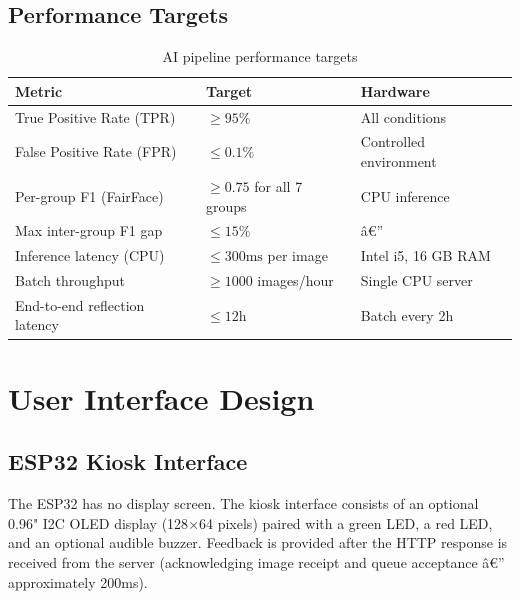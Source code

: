 \documentclass[12pt,a4paper]{report}
\begin{document}
\section{Performance Targets}

\begin{table}[H]
\centering\small
\caption{AI pipeline performance targets}
\begin{tabular}{lll}
\toprule
\textbf{Metric} & \textbf{Target} & \textbf{Hardware} \\
\midrule
True Positive Rate (TPR)     & $\geq 95\%$ & All conditions \\
False Positive Rate (FPR)    & $\leq 0.1\%$ & Controlled environment \\
Per-group F1 (FairFace)      & $\geq 0.75$ for all 7 groups & CPU inference \\
Max inter-group F1 gap       & $\leq 15\%$  & â€” \\
Inference latency (CPU)      & $\leq 300\text{ms}$ per image & Intel i5, 16 GB RAM \\
Batch throughput             & $\geq 1000$ images/hour & Single CPU server \\
End-to-end reflection latency& $\leq 12\text{h}$ & Batch every 2h \\
\bottomrule
\end{tabular}
\end{table}

\chapter{User Interface Design}

\section{ESP32 Kiosk Interface}
The ESP32 has no display screen. The kiosk interface consists of an optional 0.96" I2C OLED display (128$\times$64 pixels) paired with a green LED, a red LED, and an optional audible buzzer. Feedback is provided after the HTTP response is received from the server (acknowledging image receipt and queue acceptance â€” approximately 200ms).
\end{document}
